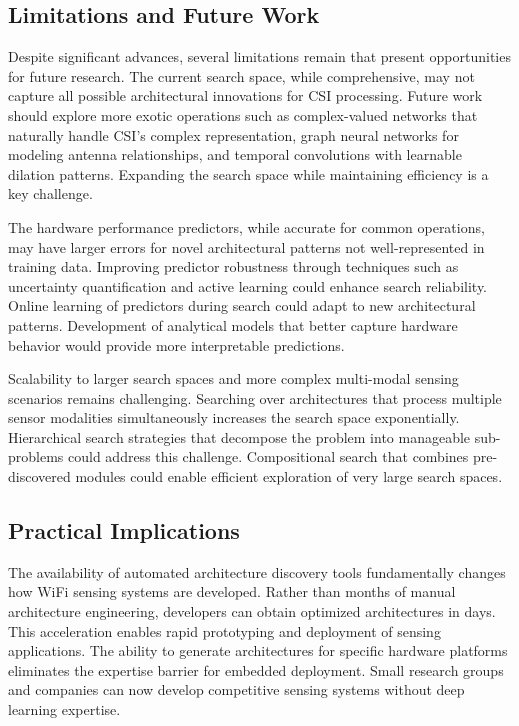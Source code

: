 \documentclass[journal]{IEEEtran}
\begin{document}
\subsection{Limitations and Future Work}

Despite significant advances, several limitations remain that present opportunities for future research. The current search space, while comprehensive, may not capture all possible architectural innovations for CSI processing. Future work should explore more exotic operations such as complex-valued networks that naturally handle CSI's complex representation, graph neural networks for modeling antenna relationships, and temporal convolutions with learnable dilation patterns. Expanding the search space while maintaining efficiency is a key challenge.

The hardware performance predictors, while accurate for common operations, may have larger errors for novel architectural patterns not well-represented in training data. Improving predictor robustness through techniques such as uncertainty quantification and active learning could enhance search reliability. Online learning of predictors during search could adapt to new architectural patterns. Development of analytical models that better capture hardware behavior would provide more interpretable predictions.

Scalability to larger search spaces and more complex multi-modal sensing scenarios remains challenging. Searching over architectures that process multiple sensor modalities simultaneously increases the search space exponentially. Hierarchical search strategies that decompose the problem into manageable sub-problems could address this challenge. Compositional search that combines pre-discovered modules could enable efficient exploration of very large search spaces.

\subsection{Practical Implications}

The availability of automated architecture discovery tools fundamentally changes how WiFi sensing systems are developed. Rather than months of manual architecture engineering, developers can obtain optimized architectures in days. This acceleration enables rapid prototyping and deployment of sensing applications. The ability to generate architectures for specific hardware platforms eliminates the expertise barrier for embedded deployment. Small research groups and companies can now develop competitive sensing systems without deep learning expertise.
\end{document}

